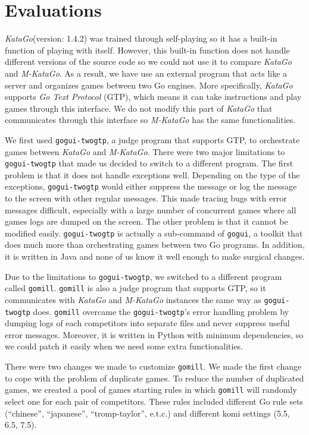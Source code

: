 \documentclass{article}
\newcommand{\katago}{\emph{KataGo}\xspace}
\newcommand{\mkatago}{\emph{M-KataGo}\xspace}
\begin{document}
\section{Evaluations}

\katago (version: 1.4.2) was trained through self-playing so it has a built-in function of playing with itself.
However, this built-in function does not handle different versions of the source code so we could not use it to compare \katago and \mkatago.
As a result, we have use an external program that acts like a server and organizes games between two Go engines.
More specifically, \katago supports \textit{Go Text Protocol} (GTP), which means it can take instructions and play games through this interface.
We do not modify this part of \katago that communicates through this interface so \mkatago has the same functionalities.

We first used \texttt{gogui-twogtp}, a judge program that supports GTP, to orchestrate games between \katago and \mkatago.
There were two major limitations to \texttt{gogui-twogtp} that made us decided to switch to a different program.
The first problem is that it does not handle exceptions well.
Depending on the type of the exceptions, \texttt{gogui-twogtp} would either suppress the message or log the message to the screen with other regular messages.
This made tracing bugs with error messages difficult, especially with a large number of concurrent games where all games logs are dumped on the screen.
The other problem is that it cannot be modified easily.
\texttt{gogui-twogtp} is actually a sub-command of \texttt{gogui}, a toolkit that does much more than orchestrating games between two Go programs.
In addition, it is written in Java and none of us know it well enough to make surgical changes.

Due to the limitations to \texttt{gogui-twogtp}, we switched to a different program called \texttt{gomill}.
\texttt{gomill} is also a judge program that supports GTP, so it communicates with \katago and \mkatago instances the same way as \texttt{gogui-twogtp} does.
\texttt{gomill} overcame the \texttt{gogui-twogtp}'s error handling problem by dumping logs of each competitors into separate files and never suppress useful error messages.
Moreover, it is written in Python with minimum dependencies, so we could patch it easily when we need some extra functionalities.

There were two changes we made to customize \texttt{gomill}.
We made the first change to cope with the problem of duplicate games.
To reduce the number of duplicated games, we created a pool of games starting rules in which \texttt{gomill} will randomly select one for each pair of competitors.
These rules included different Go rule sets (``chinese'', ``japanese'', ``tromp-taylor'', e.t.c.) and different komi settings (5.5, 6.5, 7.5).
\end{document}
